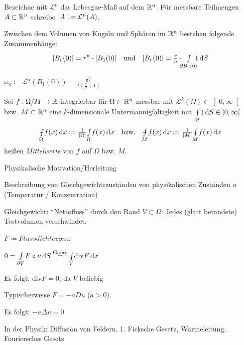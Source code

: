 \documentclass{cheat-sheet}
\newcommand{\dive}{\mathrm{div}} %
\def\Xint#1{\mathchoice
   {\XXint\displaystyle\textstyle{#1}}%
   {\XXint\textstyle\scriptstyle{#1}}%
   {\XXint\scriptstyle\scriptscriptstyle{#1}}%
   {\XXint\scriptscriptstyle\scriptscriptstyle{#1}}%
   \!\int}
\def\XXint#1#2#3{{\setbox0=\hbox{$#1{#2#3}{\int}$}
     \vcenter{\hbox{$#2#3$}}\kern-.5\wd0}}
\def\dashint{\Xint-}
\newcommand{\mymvint}[2]{{\textstyle \dashint\limits_{#1}^{#2}}}
\newcommand{\MVInt}[4]{\mymvint{#1}{#2} #3 \,\d #4}
\begin{document}
\begin{nota}
  Bezeichne mit $\mathcal{L}^n$ das Lebesgue-Maß auf dem $\mathbb{R}^n$. Für messbare Teilmengen $A \subset \mathbb{R}^n$ schreibe $\lvert A\rvert \coloneqq \mathcal{L}^n(A)$.
\end{nota}

\begin{bsp}
  Zwischen dem Volumen von Kugeln und Sphären im $\mathbb{R}^n$ bestehen folgende Zusammenhänge:
  \[
    \abs{B_r(0)} = r^n \cdot \abs{B_1(0)}
    \quad \text{und} \quad
    \abs{B_r(0)} = \tfrac{r}{n} \cdot \enspace\Int{\mathclap{\partial B_r(0)}}{}{\enspace1}{S}
  \]
\end{bsp}
\vspace{-12pt}
\begin{nota}
  $\omega_n \coloneqq \mathcal{L}^n(B_1(0)) = \frac{\pi^{\tfrac{n}{2}}}{\Gamma(\tfrac{n}{2} + 1)}$
\end{nota}

\begin{nota}
  Sei $f : \Omega / M \to \mathbb{R}$ integrierbar für $\Omega \subset \mathbb{R}^n$ messbar mit $\mathcal{L}^k(\Omega) \in \left] 0, \infty \right[$ bzw. $M \subset \mathbb{R}^n$ eine $k$-dimensionale Untermannigfaltigkeit mit ${\textstyle \int\limits_{M}^{}} 1 \,\mathrm{d} S \in \left] 0, \infty \right[$
  \[
    \MVInt{\Omega}{}{f(x)}{x} \coloneqq \tfrac{1}{\abs{\Omega}} \Int{\Omega}{}{f(x)}{x}
    \quad \text{bzw.} \quad
    \MVInt{M}{}{f(x)}{x} \coloneqq \tfrac{1}{\abs{M}} \Int{M}{}{f(x)}{x}
  \]
  heißen \emph{Mittelwerte} von $f$ auf $\Omega$ bzw. $M$.
\end{nota}


\iffalse
  Physikalische Motivation/Herleitung

  Beschreibung von Gleichgewichtszuständen von physikalischen Zuständen $u$ (Temperatur / Konzentration)

  Gleichgewicht: "`Nettofluss"' durch den Rand $V \subset \Omega$:
  Jedes (glatt berandete) Testvolumen verschwindet.

  $F \coloneqq Flussdichte von $u

  $0 = \Int{\partial V}{}{F \circ \nu}{S} \overset{\text{Gauss}}{=} \Int{V}{}{\dive F}{x}$

  Es folgt: $\dive F = 0$, da $V$ beliebig

  Typischerweise $F = -a Du$ ($a > 0$).

  Es folgt: $-a \Delta u = 0$

  In der Physik: Diffusion von Feldern, 1. Ficksche Gesetz, Wärmeleitung, Fouriersches Gesetz
\end{document}
